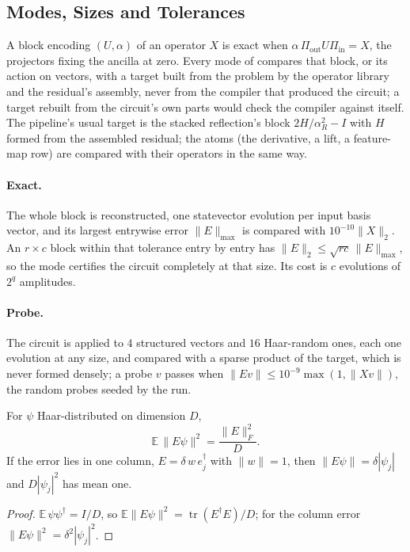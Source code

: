 \subsection{Modes, Sizes and Tolerances}
\label{app:verification-modes}

A block encoding $(U,\alpha)$ of an operator $X$ is exact when $\alpha\,\Pi_{\mathrm{out}}U\Pi_{\mathrm{in}}=X$, the projectors fixing the ancilla at zero. Every mode of  compares that block, or its action on vectors, with a target built from the problem by the operator library and the residual's assembly, never from the compiler that produced the circuit; a target rebuilt from the circuit's own parts would check the compiler against itself. The pipeline's usual target is the stacked reflection's block $2H/\alpha_R^2-I$ with $H$ formed from the assembled residual; the atoms (the derivative, a lift, a feature-map row) are compared with their operators in the same way.

\paragraph{Exact.} The whole block is reconstructed, one statevector evolution per input basis vector, and its largest entrywise error $\|E\|_{\max}$ is compared with $10^{-10}\|X\|_2$. An $r\times c$ block within that tolerance entry by entry has $\|E\|_2\le\sqrt{rc}\,\|E\|_{\max}$, so the mode certifies the circuit completely at that size. Its cost is $c$ evolutions of $2^q$ amplitudes.

\paragraph{Probe.} The circuit is applied to $4$ structured vectors and $16$ Haar-random ones, each one evolution at any size, and compared with a sparse product of the target, which is never formed densely; a probe $v$ passes when $\|Ev\|\le10^{-9}\max(1,\|Xv\|)$, the random probes seeded by the run.

\begin{proposition}
\label{prop:haar-probes}
For $\psi$ Haar-distributed on dimension $D$,
\begin{equation*}
    \mathbb{E}\,\|E\psi\|^2=\frac{\|E\|_F^2}{D}.
\end{equation*}
If the error lies in one column, $E=\delta\,w\,e_j^\dagger$ with $\|w\|=1$, then $\|E\psi\|=\delta|\psi_j|$ and $D|\psi_j|^2$ has mean one.
\end{proposition}
\begin{proof}
$\mathbb{E}\,\psi\psi^\dagger=I/D$, so $\mathbb{E}\|E\psi\|^2=\operatorname{tr}(E^\dagger E)/D$; for the column error $\|E\psi\|^2=\delta^2|\psi_j|^2$.
\end{proof}

